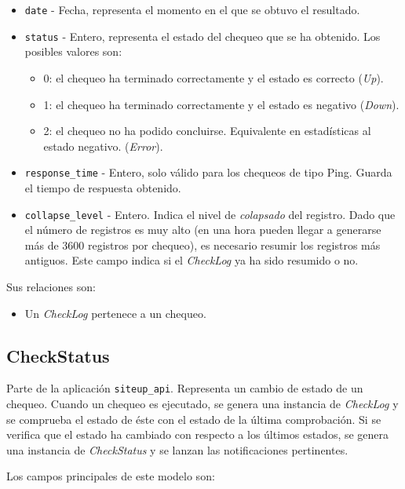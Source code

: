 \begin{itemize}
\item \texttt{date} - Fecha, representa el momento en el que se obtuvo el resultado.
\item \texttt{status} - Entero, representa el estado del chequeo que se ha
  obtenido. Los posibles valores son:
  \begin{itemize}
  \item 0: el chequeo ha terminado correctamente y el estado es correcto (\textit{Up}).
  \item 1: el chequeo ha terminado correctamente y el estado es negativo (\textit{Down}).
  \item 2: el chequeo no ha podido concluirse. Equivalente en estadísticas al estado negativo. (\textit{Error}).
  \end{itemize}
\item \texttt{response\_time} - Entero, solo válido para los chequeos de tipo
  Ping. Guarda el tiempo de respuesta obtenido.
\item \texttt{collapse\_level} - Entero. Indica el nivel de \textit{colapsado}
  del registro. Dado que el número de registros es muy alto (en una hora pueden
  llegar a generarse más de 3600 registros por chequeo), es necesario resumir
  los registros más antiguos. Este campo indica si el \textit{CheckLog} ya ha
  sido resumido o no.
\end{itemize}

Sus relaciones son:

\begin{itemize}
\item Un \textit{CheckLog} pertenece a un chequeo.
\end{itemize}

\subsection{CheckStatus}

Parte de la aplicación \texttt{siteup\_api}. Representa un cambio de estado de
un chequeo. Cuando un chequeo es ejecutado, se genera una instancia de
\textit{CheckLog} y se comprueba el estado de éste con el estado de la última
comprobación. Si se verifica que el estado ha cambiado con respecto a los
últimos estados, se genera una instancia de \textit{CheckStatus} y se lanzan las
notificaciones pertinentes.

Los campos principales de este modelo son:

